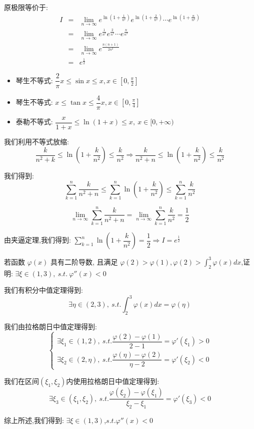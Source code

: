 \begin{solution}
	
	原极限等价于: 
	\begin{eqnarray*}
		I&=&\lim\limits_{n\to\infty}e^{\ln(1+\frac{1}{n^2})}e^{\ln(1+\frac{2}{n^2})}\cdots e^{\ln(1+\frac{n}{n^2})}\\
		&=&\lim\limits_{n\to\infty}e^{\frac{1}{n^2}}e^{\frac{2}{n^2}}\cdots e^{\frac{n}{n^2}}\\
		&=&\lim\limits_{n\to\infty}e^{\frac{n(n+1)}{2n^2}}\\
		&=&e^{\frac{1}{2}}
	\end{eqnarray*}
	\begin{lemma}[不等式放缩]
		\begin{itemize}
			\item $\text{琴生不等式: }\dfrac{2}{\pi}x\leq \sin x\leq x,x\in[0,\frac{\pi}{2}]$
			\item $\text{琴生不等式: }x\leq \tan x\leq \dfrac{4}{\pi}x,x\in[0,\frac{\pi}{4}]$
			\item $\text{泰勒不等式: }\dfrac{x}{1+x}\leq \ln(1+x)\leq x,\ x\in[0,+\infty)$
		\end{itemize}
	\end{lemma}
	我们利用不等式放缩: 
	$$\frac{k}{n^2+k}\leq \ln(1+\frac{k}{n^2})\leq \frac{k}{n^2}\Rightarrow \frac{k}{n^2+n}\leq \ln(1+\frac{k}{n^2})\leq \frac{k}{n^2}$$
	
	我们得到: 
	$$\sum\limits_{k=1}^{n}\frac{k}{n^2+n}\leq \sum\limits_{k=1}^{n}\ln(1+\frac{k}{n^2})\leq \sum\limits_{k=1}^{n}\frac{k}{n^2}$$
	
	$$\lim\limits_{n\to\infty}\sum\limits_{k=1}^{n}\frac{k}{n^2+n}=\lim\limits_{n\to\infty}\sum\limits_{k=1}^{n}\dfrac{k}{n^2}=\dfrac{1}{2}$$
	
	由夹逼定理,我们得到: $\sum\limits_{k=1}^{n}\ln(1+\dfrac{k}{n^2})=\dfrac{1}{2}\Rightarrow I=e^{\frac{1}{2}}$
\end{solution}

\begin{example}[][Exam: 31.4.10]
	若函数 $\varphi(x)$ 具有二阶导数, 且满足 $\varphi(2)>\varphi(1),\varphi(2)>\int_{2}^{3}\varphi(x)dx$,证明: $\exists \xi\in(1,3),\ s.t.\ \varphi ''(x)<0$
\end{example}

\begin{solution}
	
	我们有积分中值定理得到: 
	$$\exists \eta\in(2,3),\ s.t. \int_{2}^{3}\varphi(x)dx=\varphi(\eta)$$
	
	我们由拉格朗日中值定理得到: 
	$$\left\lbrace 
	\begin{array}{l}
		\exists \xi_{1}\in(1,2),\ s.t. \dfrac{\varphi(2)-\varphi(1)}{2-1}=\varphi '(\xi_{1})>0\\
		\exists \xi_{2}\in(2,\eta),\ s.t. \dfrac{\varphi(\eta)-\varphi(2)}{\eta-2}=\varphi '(\xi_{2})<0
	\end{array}
	\right. $$
	
	我们在区间$(\xi_{1},\xi_{2})$内使用拉格朗日中值定理得到: 
	$$\exists \xi_{3}\in(\xi_{1},\xi_{2}),\ s.t. \dfrac{\varphi(\xi_{2})-\varphi(\xi_{1})}{\xi_{2}-\xi_{1}}=\varphi '(\xi_{3})<0$$
	
	综上所述,我们得到: $\exists \xi\in(1,3)$,$s.t.\varphi ''(x)<0$
\end{solution}


